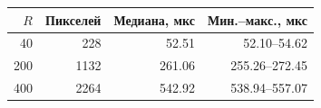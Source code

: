 \begin{tabular}{rrrr}\toprule
$R$ & Пикселей & Медиана, мкс & Мин.--макс., мкс\\\midrule
40 & 228 & 52.51 & 52.10--54.62\\
200 & 1132 & 261.06 & 255.26--272.45\\
400 & 2264 & 542.92 & 538.94--557.07\\
\bottomrule\end{tabular}
